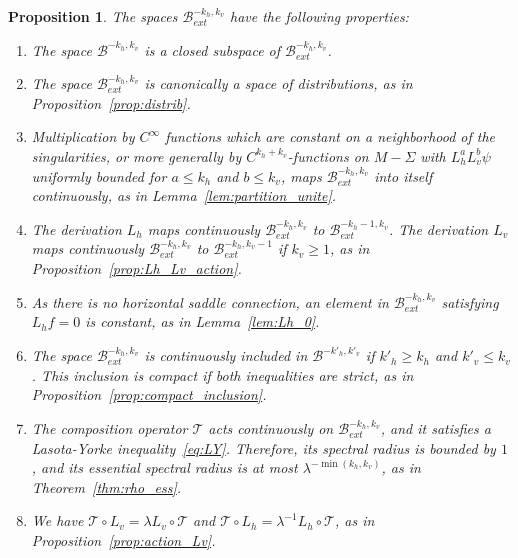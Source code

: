 \documentclass[11pt, a4paper, oneside, final, pagebackref]{amsart}
\newcommand{\boB}{\mathcal{B}}
\newcommand{\boT}{\mathcal{T}}
\renewcommand{\leq}{\leqslant}
\renewcommand{\geq}{\geqslant}
\newtheorem{prop}[thm]{Proposition}
\theoremstyle{definition}
\numberwithin{equation}{section}
\begin{document}
\begin{prop}
\label{prop:ext} The spaces $\boB_{ext}^{-k_h, k_v}$ have the following
properties:
\begin{enumerate}
\item The space $\boB^{-k_h, k_v}$ is a closed subspace of
    $\boB_{ext}^{-k_h, k_v}$.
\item The space $\boB_{ext}^{-k_h, k_v}$ is canonically a space of
    distributions, as in Proposition~\ref{prop:distrib}.
\item Multiplication by $C^\infty$ functions which are constant on a
    neighborhood of the singularities, or more generally by
    $C^{k_h+k_v}$-functions on $M-\Sigma$ with $L_h^a L_v^b \psi$ uniformly
    bounded for $a \leq k_h$ and $b \leq k_v$, maps $\boB_{ext}^{-k_h,
    k_v}$ into itself continuously, as in Lemma~\ref{lem:partition_unite}.
\item The derivation $L_h$ maps continuously $\boB_{ext}^{-k_h, k_v}$ to
    $\boB_{ext}^{-k_h-1, k_v}$. The derivation $L_v$ maps continuously
    $\boB_{ext}^{-k_h, k_v}$ to $\boB_{ext}^{-k_h, k_v-1}$ if $k_v \geq 1$,
    as in Proposition~\ref{prop:Lh_Lv_action}.
\item As there is no horizontal saddle connection, an element in
    $\boB_{ext}^{-k_h, k_v}$ satisfying $L_h f=0$ is constant, as in
    Lemma~\ref{lem:Lh_0}.
\item The space $\boB_{ext}^{-k_h, k_v}$ is continuously included in
    $\boB^{-k'_h, k'_v}$ if $k'_h \geq k_h$ and $k'_v\leq k_v$. This
    inclusion is compact if both inequalities are strict, as in
    Proposition~\ref{prop:compact_inclusion}.
\item \label{prop:Text} The composition operator $\boT$ acts continuously
    on $\boB_{ext}^{-k_h, k_v}$, and it satisfies a Lasota-Yorke
    inequality~\eqref{eq:LY}. Therefore, its spectral radius is bounded by
    $1$, and its essential spectral radius is at most $\lambda^{-\min(k_h,
    k_v)}$, as in Theorem~\ref{thm:rho_ess}.
\item We have $\boT \circ L_v = \lambda L_v \circ \boT$ and $\boT \circ L_h
    = \lambda^{-1} L_h\circ \boT$, as in Proposition~\ref{prop:action_Lv}.
\end{enumerate}
\end{prop}
\end{document}
